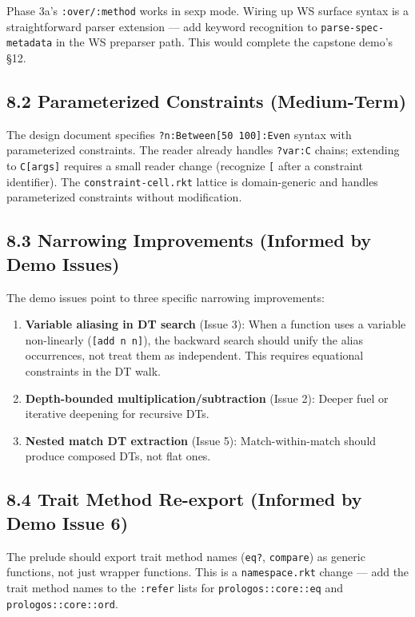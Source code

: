 \documentclass[11pt]{article}
\begin{document}
Phase 3a's \texttt{:over/:method} works in sexp mode. Wiring up WS surface syntax is a
straightforward parser extension — add keyword recognition to \texttt{parse-spec-metadata}
in the WS preparser path. This would complete the capstone demo's §12.
\subsection{8.2 Parameterized Constraints (Medium-Term)}
\label{sec:org6ddf715}

The design document specifies \texttt{?n:Between[50 100]:Even} syntax with parameterized
constraints. The reader already handles \texttt{?var:C} chains; extending to \texttt{C[args]} requires
a small reader change (recognize \texttt{[} after a constraint identifier). The
\texttt{constraint-cell.rkt} lattice is domain-generic and handles parameterized constraints
without modification.
\subsection{8.3 Narrowing Improvements (Informed by Demo Issues)}
\label{sec:org775387d}

The demo issues point to three specific narrowing improvements:

\begin{enumerate}
\item \textbf{Variable aliasing in DT search} (Issue 3): When a function uses a variable
non-linearly (\texttt{[add n n]}), the backward search should unify the alias
occurrences, not treat them as independent. This requires equational constraints
in the DT walk.

\item \textbf{Depth-bounded multiplication/subtraction} (Issue 2): Deeper fuel or iterative
deepening for recursive DTs.

\item \textbf{Nested match DT extraction} (Issue 5): Match-within-match should produce
composed DTs, not flat ones.
\end{enumerate}
\subsection{8.4 Trait Method Re-export (Informed by Demo Issue 6)}
\label{sec:org1335cd1}

The prelude should export trait method names (\texttt{eq?}, \texttt{compare}) as generic functions,
not just wrapper functions. This is a \texttt{namespace.rkt} change — add the trait method
names to the \texttt{:refer} lists for \texttt{prologos::core::eq} and \texttt{prologos::core::ord}.
\end{document}
